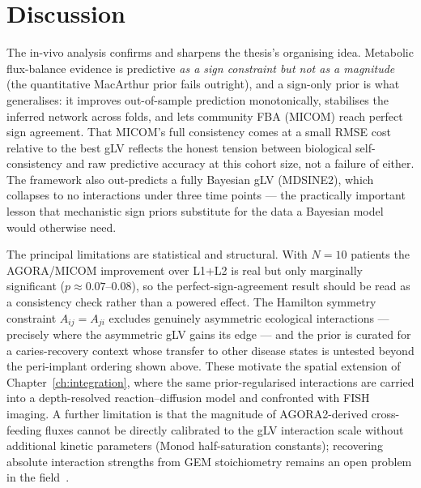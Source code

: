 \section{Discussion}
\label{sec:dieckow_discussion}

The in-vivo analysis confirms and sharpens the thesis's organising idea. Metabolic
flux-balance evidence is predictive \emph{as a sign constraint but not as a
magnitude} (the quantitative MacArthur prior fails outright), and a sign-only prior
is what generalises: it improves out-of-sample prediction monotonically, stabilises
the inferred network across folds, and lets community FBA (MICOM) reach perfect
sign agreement. That MICOM's full consistency comes at a small RMSE cost relative
to the best gLV reflects the honest tension between biological self-consistency and
raw predictive accuracy at this cohort size, not a failure of either. The framework
also out-predicts a fully Bayesian gLV (MDSINE2), which collapses to no interactions
under three time points --- the practically important lesson that mechanistic sign
priors substitute for the data a Bayesian model would otherwise need.

The principal limitations are statistical and structural. With $N=10$ patients the
AGORA/MICOM improvement over L1+L2 is real but only marginally significant
($p\approx0.07$--$0.08$), so the perfect-sign-agreement result should be read as a
consistency check rather than a powered effect. The Hamilton symmetry constraint
$A_{ij}=A_{ji}$ excludes genuinely asymmetric ecological interactions --- precisely
where the asymmetric gLV gains its edge --- and the prior is curated for a
caries-recovery context whose transfer to other disease states is untested beyond
the peri-implant ordering shown above. These motivate the spatial extension of
Chapter~\ref{ch:integration}, where the same prior-regularised interactions are
carried into a depth-resolved reaction--diffusion model and confronted with FISH
imaging.
A further limitation is that the magnitude of AGORA2-derived cross-feeding
fluxes cannot be directly calibrated to the gLV interaction scale without
additional kinetic parameters (Monod half-saturation constants); recovering
absolute interaction strengths from GEM stoichiometry remains an open problem
in the field~\cite{Rath2024GEMReliability,Mustri2025GLVABreakdown}.

